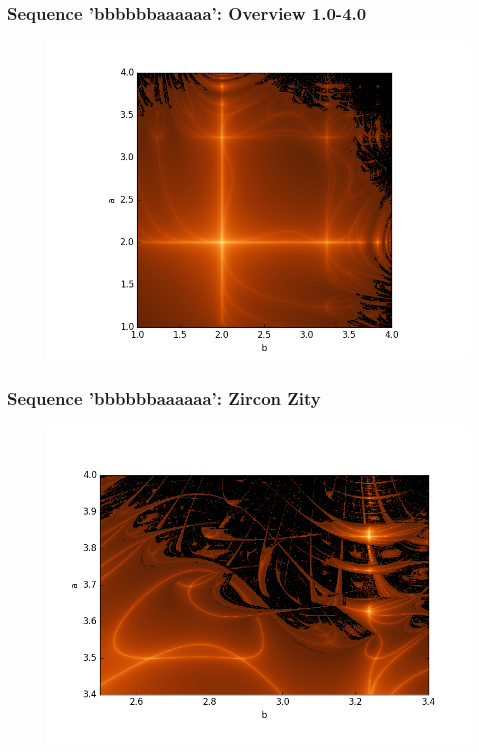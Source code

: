 \documentclass[ignorenonframetext]{beamer}
\begin{document}
\begin{frame}
\frametitle{Sequence 'bbbbbbaaaaaa': Overview 1.0-4.0}
\begin{figure}[htbp]
\includegraphics[scale = 0.5]{pictures/Overview_bbbbbbaaaaaa.png}
\end{figure}
\end{frame}

\begin{frame}
\frametitle{Sequence 'bbbbbbaaaaaa': Zircon Zity}
\begin{figure}[htbp]
\includegraphics[scale = 0.5]{pictures/zircon_city.png}
\end{figure}
\end{frame}

\begin{frame}
\\
\\
\end{frame}
\end{document}
